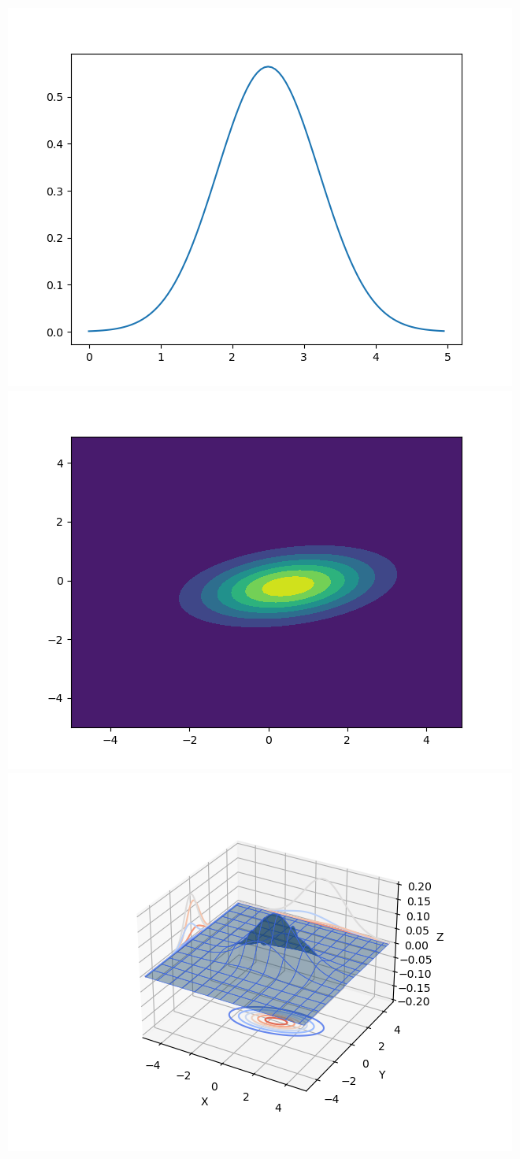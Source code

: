 \documentclass[
  letterpaper,
  DIV=11,
  numbers=noendperiod]{scrreprt}
\begin{document}
\includegraphics{Figure_4.png} \includegraphics{Figure_5.png}
\includegraphics{Figure_6.png}
\end{document}
